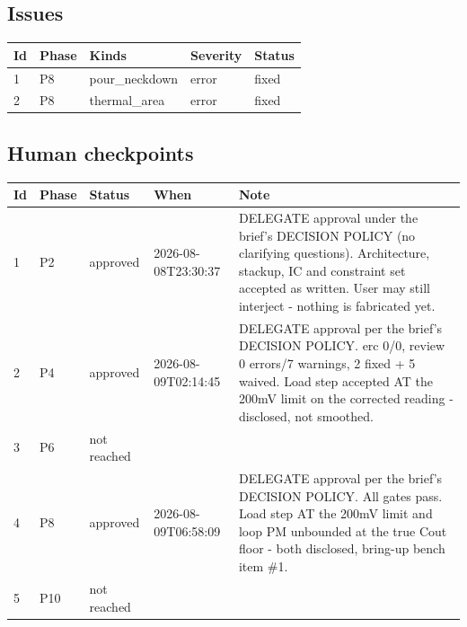 \documentclass[11pt,a4paper]{article}
\begin{document}
\subsection*{Issues}
{\small
\begin{longtable}{llp{5cm}ll}
\toprule
\textbf{Id} & \textbf{Phase} & \textbf{Kinds} & \textbf{Severity} & \textbf{Status} \\
\midrule
\endhead
1 & P8 & pour\_neckdown & error & fixed \\
2 & P8 & thermal\_area & error & fixed \\
\bottomrule
\end{longtable}
}
\subsection*{Human checkpoints}
{\small
\begin{longtable}{lllp{2.6cm}p{6.4cm}}
\toprule
\textbf{Id} & \textbf{Phase} & \textbf{Status} & \textbf{When} & \textbf{Note} \\
\midrule
\endhead
1 & P2 & approved & 2026-08-08T23:30:37 & DELEGATE approval under the brief's DECISION POLICY (no clarifying questions). Architecture, stackup, IC and constraint set accepted as written. User may still interject - nothing is fabricated yet. \\
2 & P4 & approved & 2026-08-09T02:14:45 & DELEGATE approval per the brief's DECISION POLICY. erc 0/0, review 0 errors/7 warnings, 2 fixed + 5 waived. Load step accepted AT the 200mV limit on the corrected reading - disclosed, not smoothed. \\
3 & P6 & not reached &  &  \\
4 & P8 & approved & 2026-08-09T06:58:09 & DELEGATE approval per the brief's DECISION POLICY. All gates pass. Load step AT the 200mV limit and loop PM unbounded at the true Cout floor - both disclosed, bring-up bench item \#1. \\
5 & P10 & not reached &  &  \\
\bottomrule
\end{longtable}
}
\end{document}

